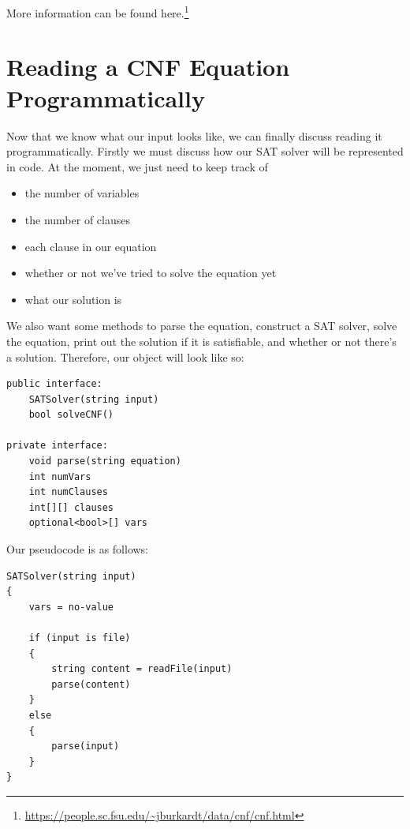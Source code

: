 More information can be found here.\footnote{\url{https://people.sc.fsu.edu/~jburkardt/data/cnf/cnf.html}}

\section{Reading a CNF Equation Programmatically}

Now that we know what our input looks like, we can finally discuss reading it
programmatically. Firstly we must discuss how our SAT solver will be represented
in code. At the moment, we just need to keep track of

\begin{itemize}
    \item the number of variables
    \item the number of clauses
    \item each clause in our equation
    \item whether or not we've tried to solve the equation yet
    \item what our solution is
\end{itemize}

We also want some methods to parse the equation, construct a SAT solver,
solve the equation, print out the solution if it is satisfiable, and whether or not
there's a solution. Therefore, our object will look like so:

\begin{lstlisting}
public interface:
    SATSolver(string input)
    bool solveCNF()

private interface:
    void parse(string equation)
    int numVars
    int numClauses
    int[][] clauses
    optional<bool>[] vars
\end{lstlisting}

Our pseudocode is as follows:

\begin{lstlisting}
SATSolver(string input)
{
    vars = no-value

    if (input is file)
    {
        string content = readFile(input)
        parse(content)
    }
    else
    {
        parse(input)
    }
}
\end{lstlisting}

